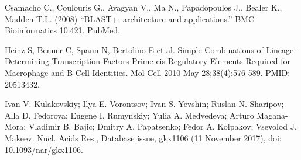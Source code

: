 \documentclass[12pt]{article}
\begin{document}
\begin{thebibliography}{99}
 Csamacho C., Coulouris G., Avagyan V., Ma N., Papadopoulos J.,
Bealer K., Madden T.L. (2008) “BLAST+: architecture and applications.”
BMC Bioinformatics 10:421. PubMed.

 Heinz S, Benner C, Spann N, Bertolino E et al. Simple
Combinations of Lineage-Determining Transcription Factors Prime cis-Regulatory
Elements Required for Macrophage and B Cell Identities. Mol Cell 2010 May
28;38(4):576-589. PMID: 20513432.

 Ivan V. Kulakovskiy; Ilya E. Vorontsov; Ivan S. Yevshin;
Ruslan N. Sharipov; Alla D. Fedorova; Eugene I. Rumynskiy; Yulia A. Medvedeva;
Arturo Magana-Mora; Vladimir B. Bajic; Dmitry A. Papatsenko; Fedor A. Kolpakov;
Vsevolod J. Makeev. Nucl. Acids Res., Database issue, gkx1106
(11 November 2017), doi: 10.1093/nar/gkx1106.

\end{thebibliography}
\end{document}
